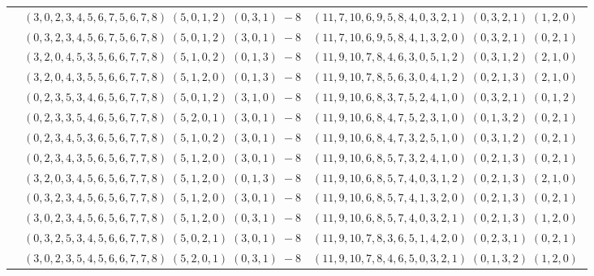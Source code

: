 \documentclass[11pt]{article}
\begin{document}
\begin{longtable}[l]{|c|c|c|}
 \cline{2-3} 
 & $(3 ,0 ,2 ,3 ,4 ,5 ,6 ,7 ,5 ,6 ,7 ,8) \;(5 ,0 ,1 ,2) \;(0 ,3 ,1) \;-8$ & $(11 ,7 ,10 ,6 ,9 ,5 ,8 ,4 ,0 ,3 ,2 ,1) \;(0 ,3 ,2 ,1) \;(1 ,2 ,0) \;$\\ 
 \cline{2-3} 
 & $(0 ,3 ,2 ,3 ,4 ,5 ,6 ,7 ,5 ,6 ,7 ,8) \;(5 ,0 ,1 ,2) \;(3 ,0 ,1) \;-8$ & $(11 ,7 ,10 ,6 ,9 ,5 ,8 ,4 ,1 ,3 ,2 ,0) \;(0 ,3 ,2 ,1) \;(0 ,2 ,1) \;$\\ 
 \cline{2-3} 
 & $(3 ,2 ,0 ,4 ,5 ,3 ,5 ,6 ,6 ,7 ,7 ,8) \;(5 ,1 ,0 ,2) \;(0 ,1 ,3) \;-8$ & $(11 ,9 ,10 ,7 ,8 ,4 ,6 ,3 ,0 ,5 ,1 ,2) \;(0 ,3 ,1 ,2) \;(2 ,1 ,0) \;$\\ 
 \cline{2-3} 
 & $(3 ,2 ,0 ,4 ,3 ,5 ,5 ,6 ,6 ,7 ,7 ,8) \;(5 ,1 ,2 ,0) \;(0 ,1 ,3) \;-8$ & $(11 ,9 ,10 ,7 ,8 ,5 ,6 ,3 ,0 ,4 ,1 ,2) \;(0 ,2 ,1 ,3) \;(2 ,1 ,0) \;$\\ 
 \cline{2-3} 
 & $(0 ,2 ,3 ,5 ,3 ,4 ,6 ,5 ,6 ,7 ,7 ,8) \;(5 ,0 ,1 ,2) \;(3 ,1 ,0) \;-8$ & $(11 ,9 ,10 ,6 ,8 ,3 ,7 ,5 ,2 ,4 ,1 ,0) \;(0 ,3 ,2 ,1) \;(0 ,1 ,2) \;$\\ 
 \cline{2-3} 
 & $(0 ,2 ,3 ,3 ,5 ,4 ,6 ,5 ,6 ,7 ,7 ,8) \;(5 ,2 ,0 ,1) \;(3 ,0 ,1) \;-8$ & $(11 ,9 ,10 ,6 ,8 ,4 ,7 ,5 ,2 ,3 ,1 ,0) \;(0 ,1 ,3 ,2) \;(0 ,2 ,1) \;$\\ 
 \cline{2-3} 
 & $(0 ,2 ,3 ,4 ,5 ,3 ,6 ,5 ,6 ,7 ,7 ,8) \;(5 ,1 ,0 ,2) \;(3 ,0 ,1) \;-8$ & $(11 ,9 ,10 ,6 ,8 ,4 ,7 ,3 ,2 ,5 ,1 ,0) \;(0 ,3 ,1 ,2) \;(0 ,2 ,1) \;$\\ 
 \cline{2-3} 
 & $(0 ,2 ,3 ,4 ,3 ,5 ,6 ,5 ,6 ,7 ,7 ,8) \;(5 ,1 ,2 ,0) \;(3 ,0 ,1) \;-8$ & $(11 ,9 ,10 ,6 ,8 ,5 ,7 ,3 ,2 ,4 ,1 ,0) \;(0 ,2 ,1 ,3) \;(0 ,2 ,1) \;$\\ 
 \cline{2-3} 
 & $(3 ,2 ,0 ,3 ,4 ,5 ,6 ,5 ,6 ,7 ,7 ,8) \;(5 ,1 ,2 ,0) \;(0 ,1 ,3) \;-8$ & $(11 ,9 ,10 ,6 ,8 ,5 ,7 ,4 ,0 ,3 ,1 ,2) \;(0 ,2 ,1 ,3) \;(2 ,1 ,0) \;$\\ 
 \cline{2-3} 
 & $(0 ,3 ,2 ,3 ,4 ,5 ,6 ,5 ,6 ,7 ,7 ,8) \;(5 ,1 ,2 ,0) \;(3 ,0 ,1) \;-8$ & $(11 ,9 ,10 ,6 ,8 ,5 ,7 ,4 ,1 ,3 ,2 ,0) \;(0 ,2 ,1 ,3) \;(0 ,2 ,1) \;$\\ 
 \cline{2-3} 
 & $(3 ,0 ,2 ,3 ,4 ,5 ,6 ,5 ,6 ,7 ,7 ,8) \;(5 ,1 ,2 ,0) \;(0 ,3 ,1) \;-8$ & $(11 ,9 ,10 ,6 ,8 ,5 ,7 ,4 ,0 ,3 ,2 ,1) \;(0 ,2 ,1 ,3) \;(1 ,2 ,0) \;$\\ 
 \cline{2-3} 
 & $(0 ,3 ,2 ,5 ,3 ,4 ,5 ,6 ,6 ,7 ,7 ,8) \;(5 ,0 ,2 ,1) \;(3 ,0 ,1) \;-8$ & $(11 ,9 ,10 ,7 ,8 ,3 ,6 ,5 ,1 ,4 ,2 ,0) \;(0 ,2 ,3 ,1) \;(0 ,2 ,1) \;$\\ 
 \cline{2-3} 
 & $(3 ,0 ,2 ,3 ,5 ,4 ,5 ,6 ,6 ,7 ,7 ,8) \;(5 ,2 ,0 ,1) \;(0 ,3 ,1) \;-8$ & $(11 ,9 ,10 ,7 ,8 ,4 ,6 ,5 ,0 ,3 ,2 ,1) \;(0 ,1 ,3 ,2) \;(1 ,2 ,0) \;$\\ 

\end{longtable}
\end{document}
